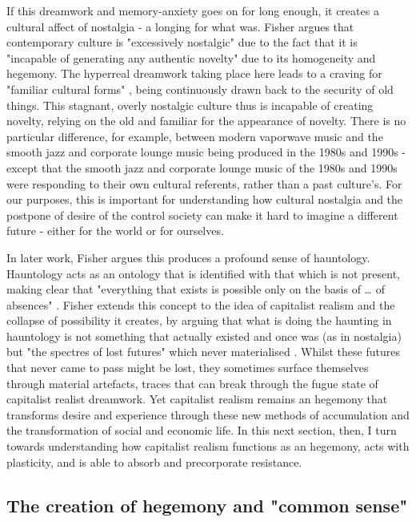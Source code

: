 If this dreamwork and memory-anxiety goes on for long enough, it creates a cultural affect of nostalgia - a longing for what was. Fisher argues that contemporary culture is "excessively nostalgic" due to the fact that it is "incapable of generating any authentic novelty" \citep[63]{fisher_capitalist_2009} due to its homogeneity and hegemony. The hyperreal dreamwork taking place here leads to a craving for "familiar cultural forms" \citep[63]{fisher_capitalist_2009}, being continuously drawn back to the security of old things. This stagnant, overly nostalgic culture thus is incapable of creating novelty, relying on the old and familiar for the appearance of novelty. There is no particular difference, for example, between modern vaporwave music and the smooth jazz and corporate lounge music being produced in the 1980s and 1990s - except that the smooth jazz and corporate lounge music of the 1980s and 1990s were responding to their own cultural referents, rather than a past culture's. For our purposes, this is important for understanding how  cultural nostalgia and the postpone of desire of the control society can make it hard to imagine a different future - either for the world or for ourselves.

In later work,  Fisher argues this produces a profound sense of hauntology. Hauntology acts as an ontology that is identified with that which is not present, making clear that "everything that exists is possible only on the basis of \ldots{} of absences" \citep[187]{fisher_ghosts_2014}. Fisher extends this concept to the idea of capitalist realism and the collapse of possibility it creates, by arguing that what is doing the haunting in hauntology is not something that actually existed and once was (as in nostalgia) but "the spectres of lost futures" which never materialised \citep[21]{fisher_ghosts_2014}. Whilst these futures that never came to pass might be lost, they sometimes surface themselves through material artefacts, traces that can break through the fugue state of capitalist realist dreamwork. Yet capitalist realism remains an hegemony that transforms desire and experience through these new methods of accumulation and the transformation of social and economic life. In this next section, then, I turn towards understanding how capitalist realism functions as an hegemony, acts with plasticity, and is able to absorb and precorporate resistance.

\subsection{The creation of hegemony and "common sense"}
\label{subsec:the-creation-of-hegemony-and-common-sense}


